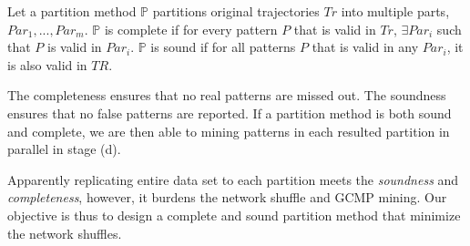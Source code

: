 \begin{definition}
Let a partition method $\mathbb{P}$ partitions original trajectories $Tr$ into multiple parts, $Par_1,...,Par_m$. $\mathbb{P}$ is complete if for every pattern $P$ that is valid in $Tr$, $\exists Par_i$ such that $P$ is valid in $Par_i$. $\mathbb{P}$ is sound if for all patterns $P$ that is valid in any $Par_i$, it is also valid in $TR$.
\end{definition}
The completeness ensures that no real patterns are missed out. The soundness ensures that no false patterns are reported. If a partition method is both sound and complete, we are then able to mining patterns in each resulted partition in parallel in stage (d). 

Apparently replicating entire data set to each partition meets the \emph{soundness} and \emph{completeness}, however, it burdens the network shuffle and GCMP mining. Our objective is thus to design a complete and sound partition method that
minimize the network shuffles.



%


